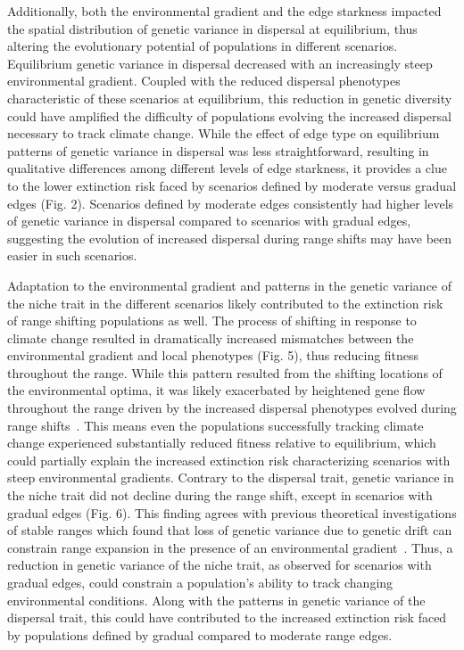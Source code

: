 \documentclass[11pt]{article}
\begin{document}
Additionally, both the environmental gradient and the edge starkness impacted the spatial distribution of genetic variance in dispersal at equilibrium, thus altering the evolutionary potential of populations in different scenarios. Equilibrium genetic variance in dispersal decreased with an increasingly steep environmental gradient. Coupled with the reduced dispersal phenotypes characteristic of these scenarios at equilibrium, this reduction in genetic diversity could have amplified the difficulty of populations evolving the increased dispersal necessary to track climate change. While the effect of edge type on equilibrium patterns of genetic variance in dispersal was less straightforward, resulting in qualitative differences among different levels of edge starkness, it provides a clue to the lower extinction risk faced by scenarios defined by moderate versus gradual edges (Fig. 2). Scenarios defined by moderate edges consistently had higher levels of genetic variance in dispersal compared to scenarios with gradual edges, suggesting the evolution of increased dispersal during range shifts may have been easier in such scenarios.

Adaptation to the environmental gradient and patterns in the genetic variance of the niche trait in the different scenarios likely contributed to the extinction risk of range shifting populations as well. The process of shifting in response to climate change resulted in dramatically increased mismatches between the environmental gradient and local phenotypes (Fig. 5), thus reducing fitness throughout the range. While this pattern resulted from the shifting locations of the environmental optima, it was likely exacerbated by heightened gene flow throughout the range driven by the increased dispersal phenotypes evolved during range shifts~\citep{lenormand2002gene}. This means even the populations successfully tracking climate change experienced substantially reduced fitness relative to equilibrium, which could partially explain the increased extinction risk characterizing scenarios with steep environmental gradients. Contrary to the dispersal trait, genetic variance in the niche trait did not decline during the range shift, except in scenarios with gradual edges (Fig. 6). This finding agrees with previous theoretical investigations of stable ranges which found that loss of genetic variance due to genetic drift can constrain range expansion in the presence of an environmental gradient~\citep{polechova2018sky, polechova2015limits}. Thus, a reduction in genetic variance of the niche trait, as observed for scenarios with gradual edges, could constrain a population's ability to track changing environmental conditions. Along with the patterns in genetic variance of the dispersal trait, this could have contributed to the increased extinction risk faced by populations defined by gradual compared to moderate range edges.
\end{document}
